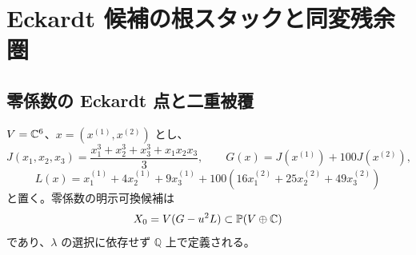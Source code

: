 \section{Eckardt 候補の根スタックと同変残余圏}
\label{mix:sec:eckardt}

\subsection{零係数の Eckardt 点と二重被覆}

$V=\mathbb C^6$、$x=(x^{(1)},x^{(2)})$ とし、
\[
 J(x_1,x_2,x_3)=\frac{x_1^3+x_2^3+x_3^3+x_1x_2x_3}{3},\qquad
 G(x)=J(x^{(1)})+100J(x^{(2)}),
\]
\[
 L(x)=x^{(1)}_1+4x^{(1)}_2+9x^{(1)}_3
       +100(16x^{(2)}_1+25x^{(2)}_2+49x^{(2)}_3)
\]
と置く。零係数の明示可換候補は
\[
 X_0=V(G-u^2L)\subset\mathbb P(V\oplus\mathbb C)
\]
であり、$\lambda$ の選択に依存せず $\mathbb Q$ 上で定義される。

